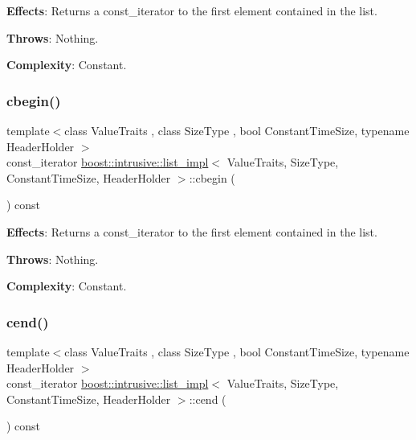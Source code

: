 {\bfseries Effects}\+: Returns a const\+\_\+iterator to the first element contained in the list.

{\bfseries Throws}\+: Nothing.

{\bfseries Complexity}\+: Constant. \mbox{\label{classboost_1_1intrusive_1_1list__impl_adc17ab4f4ca5c3817adf62960dec3d40}} 
\subsubsection{\texorpdfstring{cbegin()}{cbegin()}}
{\footnotesize\ttfamily template$<$class Value\+Traits , class Size\+Type , bool Constant\+Time\+Size, typename Header\+Holder $>$ \\
const\+\_\+iterator \hyperlink{classboost_1_1intrusive_1_1list__impl}{boost\+::intrusive\+::list\+\_\+impl}$<$ Value\+Traits, Size\+Type, Constant\+Time\+Size, Header\+Holder $>$\+::cbegin (\begin{DoxyParamCaption}{ }\end{DoxyParamCaption}) const\hspace{0.3cm}{\ttfamily [inline]}}

{\bfseries Effects}\+: Returns a const\+\_\+iterator to the first element contained in the list.

{\bfseries Throws}\+: Nothing.

{\bfseries Complexity}\+: Constant. \mbox{\label{classboost_1_1intrusive_1_1list__impl_ab683bf5010edc6008b3c6e0adbc33b70}} 
\subsubsection{\texorpdfstring{cend()}{cend()}}
{\footnotesize\ttfamily template$<$class Value\+Traits , class Size\+Type , bool Constant\+Time\+Size, typename Header\+Holder $>$ \\
const\+\_\+iterator \hyperlink{classboost_1_1intrusive_1_1list__impl}{boost\+::intrusive\+::list\+\_\+impl}$<$ Value\+Traits, Size\+Type, Constant\+Time\+Size, Header\+Holder $>$\+::cend (\begin{DoxyParamCaption}{ }\end{DoxyParamCaption}) const\hspace{0.3cm}{\ttfamily [inline]}}

